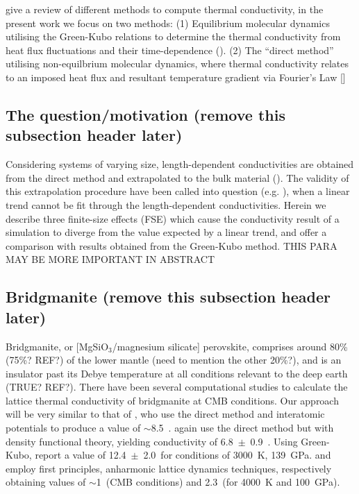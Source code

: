 \documentclass[%
preprint,                                  %
nofootinbib,
 amsmath,amssymb,
 aps,
]{revtex4-1}
\begin{document}
\citet{Stackhouse2010} give a review of different methods to compute thermal conductivity, in the present work we focus on two methods:
(1) Equilibrium molecular dynamics utilising the Green-Kubo relations to determine the thermal conductivity from heat flux fluctuations and their time-dependence (\citet{Green1954,Kubo1957,Kubo1966,Schelling2002}). 
(2) The ``direct method'' utilising non-equilbrium molecular dynamics, where thermal conductivity relates to an imposed heat flux and resultant temperature gradient via Fourier's Law [\citet{Muller-Plathe1997,Nieto-Draghi2013}]


\subsection{\label{sec:intro.question}The question/motivation (remove this subsection header later)}

Considering systems of varying size, length-dependent conductivities are obtained from the direct method and extrapolated to the bulk material (\citet{Schelling2002}). The validity of this extrapolation procedure have been called into question (e.g. \citet{Sellan2010}), when a linear trend cannot be fit through the length-dependent conductivities. Herein we describe three finite-size effects (FSE) which cause the conductivity result of a simulation to diverge from the value expected by a linear trend, and offer a comparison with results obtained from the Green-Kubo method. THIS PARA MAY BE MORE IMPORTANT IN ABSTRACT




\subsection{\label{sec:intro.brdg}Bridgmanite (remove this subsection header later)}

Bridgmanite, or [MgSiO$_3$/magnesium silicate] perovskite, comprises around 80\% (75\%? REF?) of the lower mantle (need to mention the other 20\%?), and is an insulator past its Debye temperature at all conditions relevant to the deep earth (TRUE? REF?). There have been several computational studies to calculate the lattice thermal conductivity of bridgmanite at CMB conditions.  
Our approach will be very similar to that of \citet{Ammann2014}, who use the direct method and interatomic potentials to produce a value of $\sim$8.5~\wmk. \citet{Stackhouse2015} again use the direct method but with density functional theory, yielding conductivity of 6.8~$\pm$~0.9~\wmk. Using Green-Kubo, \citet{Haigis2013} report a value of 12.4~$\pm$~2.0~\wmk for conditions of 3000~K, 139~GPa. \citet{Tang2014} and \citet{Dekura2013} employ first principles, anharmonic lattice dynamics techniques, respectively obtaining values of $\sim$1~\wmk (CMB conditions) and 2.3~\wmk (for 4000~K and 100~GPa).
\end{document}
